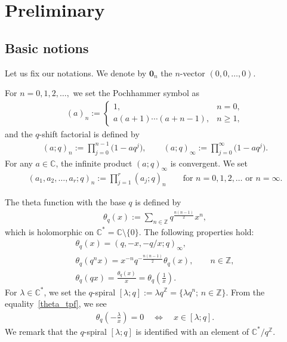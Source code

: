 \section{Preliminary}\label{Section:Preliminary}
\subsection{Basic notions}
Let us fix our notations. We denote by $\bm{0}_n$ the $n$-vector $(0,0,\ldots,0)$.

For $n=0,1,2,\ldots,$ we set the Pochhammer symbol as
\begin{gather*}
(a)_n:=
\begin{cases}
1,& n=0,\\
a(a+1)\cdots(a+n-1), &n\geq1,
\end{cases}
\end{gather*}
and the $q$-shift factorial is defined by
\begin{gather*}
(a;q)_n:=\prod_{j=0}^{n-1}\big(1-aq^j\big),\qquad (a;q)_\infty:=\prod_{j=0}^\infty \big(1-aq^j\big).
\end{gather*}
For any $a\in\mathbb{C}$, the infinite product $(a;q)_\infty$ is convergent. We set
\begin{gather*} (a_1,a_2,\ldots,a_r;q)_{n}:=\prod\limits_{j=1}^r (a_j;q)_n \qquad \text{for $n=0,1,2,\ldots$ or $n=\infty$}.
\end{gather*}

The theta function with the base $q$ is defined by
\begin{gather*}
\theta_q(x):=\sum_{n\in\mathbb{Z}}q^{\frac{n(n-1)}{2}}x^n,
\end{gather*}
which is holomorphic on $\mathbb{C}^*=\mathbb{C}\setminus\{0\}$. The following properties hold:
\begin{gather}
\theta_q(x) =(q,-x,-q/x;q)_\infty,\label{theta_tpf}\\
\theta_q(q^nx) =x^{-n}q^{-\frac{n(n-1)}{2}}\theta_q(x),\qquad n\in\mathbb{Z},\label{theta_q-diff}\\
\theta_q(qx) =\frac{\theta_q(x)}{x}=\theta_q\left(\frac{1}{x}\right)\label{theta_inverse}.
\end{gather}
For $\lambda\in\mathbb{C}^*$, we set the $q$-spiral $[\lambda;q]:=\lambda q^\mathbb{Z}=\{\lambda q^n ;\,n\in\mathbb{Z}\}$. From the equality~\eqref{theta_tpf}, we see
\begin{gather*}
\theta_q\left(-\frac{\lambda}{x}\right)=0\quad \Leftrightarrow \quad x\in[\lambda;q].
\end{gather*}
We remark that the $q$-spiral $[\lambda;q]$ is identified with an element of $\mathbb{C}^*/q^\mathbb{Z}$.

